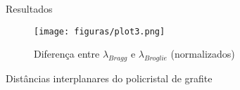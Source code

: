 \documentclass[aspectratio=169,12.5pt,xcolor=dvipsnames]{beamer}
\begin{document}
\begin{frame}{Resultados}

        \begin{center}
        \begin{figure}
        \caption{Diferença entre $\lambda_{Bragg}$ e $\lambda_{Broglie}$ (normalizados)}
        \vspace*{-0.25cm}
        \texttt{[image: figuras/plot3.png]}\par
        \end{figure}
        \end{center}
    
\end{frame}

\begin{frame}{Distâncias
interplanares do policristal de grafite}

    \begin{table}[h!]
    \centering
    \caption{Valores $d$ (distâncias
interplanares) em ångströms (\AA)}
    \end{table}
    


\end{frame}
\end{document}
